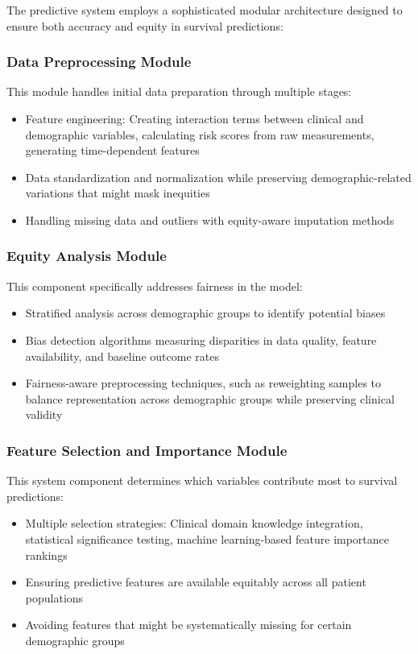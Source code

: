 The predictive system employs a sophisticated modular architecture designed to ensure both accuracy and equity in survival predictions:

\subsubsection{Data Preprocessing Module}
This module handles initial data preparation through multiple stages:
\begin{itemize}
    \item Feature engineering: Creating interaction terms between clinical and demographic variables, calculating risk scores from raw measurements, generating time-dependent features
    \item Data standardization and normalization while preserving demographic-related variations that might mask inequities
    \item Handling missing data and outliers with equity-aware imputation methods
\end{itemize}

\subsubsection{Equity Analysis Module}
This component specifically addresses fairness in the model:
\begin{itemize}
    \item Stratified analysis across demographic groups to identify potential biases
    \item Bias detection algorithms measuring disparities in data quality, feature availability, and baseline outcome rates
    \item Fairness-aware preprocessing techniques, such as reweighting samples to balance representation across demographic groups while preserving clinical validity
\end{itemize}

\subsubsection{Feature Selection and Importance Module}
This system component determines which variables contribute most to survival predictions:
\begin{itemize}
    \item Multiple selection strategies: Clinical domain knowledge integration, statistical significance testing, machine learning-based feature importance rankings
    \item Ensuring predictive features are available equitably across all patient populations
    \item Avoiding features that might be systematically missing for certain demographic groups
\end{itemize}

